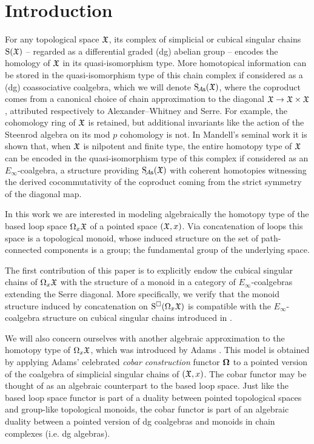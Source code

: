 
\section{Introduction}

For any topological space $\mathfrak{X}$, its complex of simplicial or cubical singular chains $\operatorname{S}(\mathfrak{X})$ -- regarded as a differential graded (dg) abelian group -- encodes the homology of $\mathfrak{X}$ in its quasi-isomorphism type.
More homotopical information can be stored in the quasi-isomorphism type of this chain complex if considered as a (dg) coassociative coalgebra, which we will denote $\operatorname{S_{\!{\mathcal{A}\mathsf{s}}}}(\mathfrak{X})$, where the coproduct comes from a canonical choice of chain approximation to the diagonal $\mathfrak{X} \to \mathfrak{X} \times \mathfrak{X}$, attributed respectively to Alexander--Whitney and Serre.
For example, the cohomology ring of $\mathfrak{X}$ is retained, but additional invariants like the action of the Steenrod algebra on its mod $p$ cohomology is not.
In Mandell's seminal work \cite{mandell2006homotopy_type} it is shown that, when $\mathfrak{X}$ is nilpotent and finite type, the entire homotopy type of $\mathfrak{X}$ can be encoded in the quasi-isomorphism type of this complex if considered as an $E_\infty$-coalgebra, a structure providing $\operatorname{S_{\!{\mathcal{A}\mathsf{s}}}}(\mathfrak{X})$ with coherent homotopies witnessing the derived cocommutativity of the coproduct coming from the strict symmetry of the diagonal map.

In this work we are interested in modeling algebraically the homotopy type of the based loop space $\Omega_x \mathfrak{X}$ of a pointed space $(\mathfrak{X}, x)$.
Via concatenation of loops this space is a topological monoid, whose induced structure on the set of path-connected components is a group; the fundamental group of the underlying space.

The first contribution of this paper is to explicitly endow the cubical singular chains of $\Omega_x \mathfrak{X}$ with the structure of a monoid in a category of $E_\infty$-coalgebras extending the Serre diagonal.
More specifically, we verify that the monoid structure induced by concatenation on $\operatorname{S^{\square}}(\Omega_x \mathfrak{X})$ is compatible with the $E_\infty$-coalgebra structure on cubical singular chains introduced in \cite{medina2022cube_einfty}.

We will also concern ourselves with another algebraic approximation to the homotopy type of $\Omega_x \mathfrak{X}$, which was introduced by Adams \cite{adams1956cobar}.
This model is obtained by applying Adams' celebrated \textit{cobar construction} functor $\operatorname{\mathbf{\Omega}}$ to a pointed version of the coalgebra of simplicial singular chains of $(\mathfrak{X}, x)$.
The cobar functor may be thought of as an algebraic counterpart to the based loop space.
Just like the based loop space functor is part of a duality between pointed topological spaces and group-like topological monoids, the cobar functor is part of an algebraic duality between a pointed version of dg coalgebras and monoids in chain complexes (i.e. dg algebras). 

